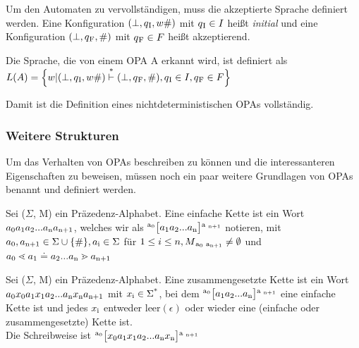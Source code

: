 Um den Automaten zu vervollständigen, muss die akzeptierte Sprache definiert werden. Eine Konfiguration $(\bot, q\textsubscript{I}, w\#)$ mit $q\textsubscript{I} \in I$ heißt \textit{initial} und eine Konfiguration $(\bot, q\textsubscript{F}, \#)$ mit $q\textsubscript{F} \in F$ heißt akzeptierend.
\begin{definition}
Die Sprache, die von einem OPA A erkannt wird, ist definiert als\\
$L(A)=  \Big \{ w | (\bot, q\textsubscript{I}, w\#) \overset{*}{\vdash} (\bot, q \textsubscript{F},\#), q\textsubscript{I} \in I, q \textsubscript{F} \in F \Big \}$
\end{definition}
Damit ist die Definition eines nichtdeterministischen OPAs vollständig.
\subsubsection*{Weitere Strukturen}
Um das Verhalten von OPAs beschreiben zu können und die interessanteren Eigenschaften zu beweisen, müssen noch ein paar weitere Grundlagen von OPAs benannt und definiert werden.

\begin{definition}
Sei ($\Sigma$, M) ein Präzedenz-Alphabet. Eine einfache Kette ist ein Wort $a\textsubscript{0} a\textsubscript{1}a\textsubscript{2}...a\textsubscript{n}a\textsubscript{n+1}$, welches wir als $\textsuperscript{a\textsubscript{0}} \big[ a\textsubscript{1} a\textsubscript{2}... a\textsubscript{n} \big] \textsuperscript{a \textsubscript{n+1}}$ notieren,
mit $a\textsubscript{0}, a\textsubscript{n+1} \in \Sigma \cup \{ \# \}, a\textsubscript{i} \in \Sigma$ für $ 1 \leq i \leq n, M\textsubscript{a\textsubscript{0} a\textsubscript{n+1}} \neq \emptyset$ und $ a\textsubscript{0} \lessdot a\textsubscript{1} \doteq a\textsubscript{2}...a\textsubscript{n} \gtrdot a\textsubscript{n+1}$
\end{definition}

\begin{definition}
Sei ($\Sigma$, M) ein Präzedenz-Alphabet. Eine zusammengesetzte Kette ist ein Wort $a\textsubscript{0} x\textsubscript{0} a\textsubscript{1} x\textsubscript{1} a\textsubscript{2}...a\textsubscript{n}x\textsubscript{n} a\textsubscript{n+1}$ mit $x\textsubscript{i} \in \Sigma \textsuperscript{*}$, bei dem $\textsuperscript{a\textsubscript{0}} \big[ a\textsubscript{1} a\textsubscript{2}... a\textsubscript{n} \big] \textsuperscript{a \textsubscript{n+1}}$ eine einfache Kette ist und jedes $x\textsubscript{i}$ entweder leer$(\epsilon)$ oder wieder eine (einfache oder zusammengesetzte) Kette ist.\\
Die Schreibweise ist $\textsuperscript{a\textsubscript{0}} \big[x\textsubscript{0} a\textsubscript{1} x\textsubscript{1} a\textsubscript{2}... a\textsubscript{n} x\textsubscript{n} \big] \textsuperscript{a \textsubscript{n+1}}$
\end{definition}

